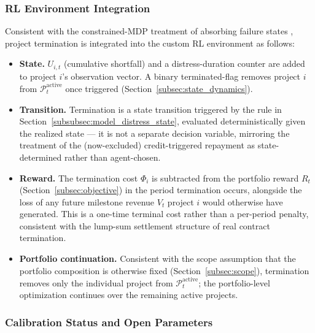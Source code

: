 \subsubsection{RL Environment Integration}
\label{subsubsec:model_rl_integration}

Consistent with the constrained-MDP treatment of absorbing failure states \cite{borkarjain2014riskconstrained}, project termination is integrated into the custom RL environment as follows:

\begin{itemize}
\item \textbf{State.} $U_{i,t}$ (cumulative shortfall) and a distress-duration counter are added to project $i$'s observation vector. A binary terminated-flag removes project $i$ from $\mathcal{P}_t^{\mathrm{active}}$ once triggered (Section~\ref{subsec:state_dynamics}).
\item \textbf{Transition.} Termination is a state transition triggered by the rule in Section~\ref{subsubsec:model_distress_state}, evaluated deterministically given the realized state — it is not a separate decision variable, mirroring the treatment of the (now-excluded) credit-triggered repayment as state-determined rather than agent-chosen.
\item \textbf{Reward.} The termination cost $\Phi_i$ is subtracted from the portfolio reward $R_t$ (Section~\ref{subsec:objective}) in the period termination occurs, alongside the loss of any future milestone revenue $V_t$ project $i$ would otherwise have generated. This is a one-time terminal cost rather than a per-period penalty, consistent with the lump-sum settlement structure of real contract termination.
\item \textbf{Portfolio continuation.} Consistent with the scope assumption that the portfolio composition is otherwise fixed (Section~\ref{subsec:scope}), termination removes only the individual project from $\mathcal{P}_t^{\mathrm{active}}$; the portfolio-level optimization continues over the remaining active projects.
\end{itemize}

\subsubsection{Calibration Status and Open Parameters}
\label{subsubsec:model_calibration_status}

